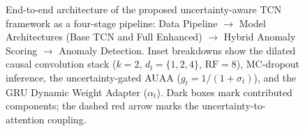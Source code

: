 \begin{figure}[H]
\centering
\resizebox{\textwidth}{!}{}
\caption{End-to-end architecture of the proposed uncertainty-aware TCN framework as a four-stage pipeline: Data Pipeline $\to$ Model Architectures (Base TCN and Full Enhanced) $\to$ Hybrid Anomaly Scoring $\to$ Anomaly Detection. Inset breakdowns show the dilated causal convolution stack ($k{=}2$, $d_l{=}\{1,2,4\}$, $\mathrm{RF}{=}8$), MC-dropout inference, the uncertainty-gated AUAA ($g_t{=}1/(1{+}\sigma_t)$), and the GRU Dynamic Weight Adapter ($\alpha_t$). Dark boxes mark contributed components; the dashed red arrow marks the uncertainty-to-attention coupling.}
\label{fig:architecture}
\end{figure}

